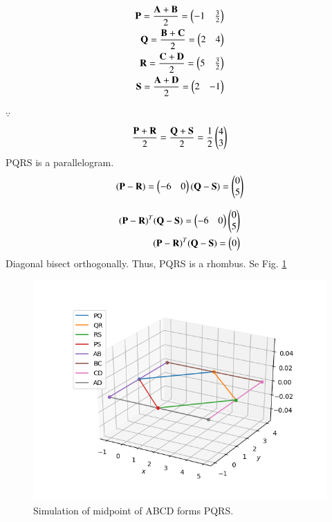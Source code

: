 \begin{align}
\begin{split}
\mathbf{P}=\frac{\mathbf{A+B}}{2}=\begin{pmatrix}-1 & \frac{3}{2}\end{pmatrix} \\ 
\mathbf{Q}=\frac{\mathbf{B+C}}{2}=\begin{pmatrix}2 &4 \end{pmatrix}  \\ 
\mathbf{R}=\frac{\mathbf{C+D}}{2}=\begin{pmatrix}5 & \frac{3}{2}\end{pmatrix}  \\ 
\mathbf{S}=\frac{\mathbf{A+D}}{2}=\begin{pmatrix}2 & -1\end{pmatrix}  
\end{split}
\label{eq:solutions/quad/1/eqn} 
\end{align}

$\because$
\begin{align}
\frac{\mathbf{P+R}}{2} = \frac{\mathbf{Q+S}}{2}=\frac{1}{2}\begin{pmatrix}4 \\ 3\end{pmatrix} 
\end{align} 
PQRS is a parallelogram.
\begin{align}
(\mathbf{P-R})=\begin{pmatrix}-6 & 0\end{pmatrix} 
(\mathbf{Q-S})=\begin{pmatrix}0\\5\end{pmatrix} 
\\
\end{align}

\begin{align}
(\mathbf{P-R})^T(\mathbf{Q-S}) = \begin{pmatrix}-6 & 0\end{pmatrix}
\begin{pmatrix} 0 \\ 5 \end{pmatrix} 
\\
(\mathbf{P-R})^T(\mathbf{Q-S})=\begin{pmatrix}0\end{pmatrix}
\\  
\end{align}
Diagonal bisect orthogonally. 
Thus, PQRS is a rhombus.  Se Fig. \ref{eq:solutions/quad/1/fig:Simulation of midpoint of ABCD form PQRS}

\begin{figure}[htbp]
\centering \includegraphics[width=\columnwidth]{./solutions/quad/1/Figure_1.png}
\caption{Simulation of midpoint of ABCD forms PQRS.}
\label{eq:solutions/quad/1/fig:Simulation of midpoint of ABCD form PQRS}
\end{figure}



